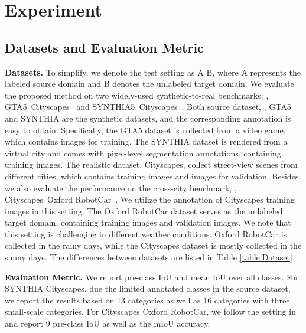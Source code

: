 \section{Experiment} \label{experiments}
\subsection{Datasets and Evaluation Metric}
\noindent\textbf{Datasets.} To simplify, we denote the test setting as A  B, where A represents the labeled source domain and B denotes the unlabeled target domain. We evaluate the proposed method on two widely-used synthetic-to-real benchmarks: \ie, GTA5~\cite{richter2016playing}Cityscapes~\cite{cordts2016cityscapes} and SYNTHIA5~\cite{ros2016synthia}Cityscapes~\cite{cordts2016cityscapes}. Both source dataset, \ie, GTA5 and SYNTHIA are the synthetic datasets, and the corresponding annotation is easy to obtain. 
Specifically, the GTA5 dataset is collected from a video game, which contains  images for training. The SYNTHIA dataset is rendered from a virtual city and comes with pixel-level segmentation annotations, containing  training images. 
The realistic dataset, Cityscapes, collect street-view scenes from  different cities, which contains  training images and  images for validation. 
Besides, we also evaluate the performance on the cross-city benchmark, \ie, Cityscapes~\cite{cordts2016cityscapes}Oxford RobotCar~\cite{RobotCarDatasetIJRR}. 
We utilize the annotation of Cityscapes training images in this setting. The Oxford RobotCar dataset serves as the unlabeled target domain, containing  training images and  validation images. We note that this setting is challenging in different weather conditions. Oxford RobotCar is collected in the rainy days, while the Cityscapes dataset is mostly collected in the sunny days. 
The differences between datasets are listed in Table \ref{table:Dataset}.

\noindent\textbf{Evaluation Metric.} We report pre-class IoU and mean IoU over all classes. For SYNTHIA  Cityscapes, due the limited annotated classes in the source dataset, we report the results based on 13 categories as well as 16 categories with three small-scale categories. For Cityscapes  Oxford RobotCar, we follow the setting in \cite{tsai2019domain} and report 9 pre-class IoU as well as the mIoU accuracy.

